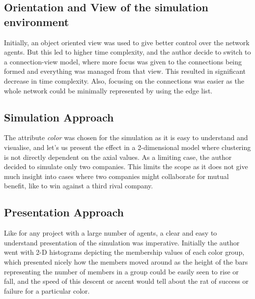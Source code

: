 \subsection{Orientation and View of the simulation environment}

Initially, an object oriented view was used to give better control over the network agents. But this led to higher time complexity, and the author decide to switch to a connection-view model, where more focus was given to the connections being formed and everything was managed from that view. This resulted in significant decrease in time complexity.
Also, focusing on the connections was easier as the whole network could be minimally represented by using the edge list.



\subsection{Simulation Approach}

The attribute \emph{color} was chosen for the simulation as it is easy to understand and visualise, and let's us present the effect in a 2-dimensional model where clustering is not directly dependent on the axial values. 
As a limiting case, the author decided to simulate only two companies. This limits the scope as it does not give much insight into cases where two companies might collaborate for mutual benefit, like to win against a third rival company.


\subsection{Presentation Approach}
Like for any project with a large number of agents, a clear and easy to understand presentation of the simulation was imperative.
Initially the author went with 2-D histograms depicting the membership values of each color group, which presented nicely how the members moved around as the height of the  bars representing the number of members in a group could be easily seen to rise or fall, and the speed of this descent or ascent would tell about the rat of success or failure for a particular color.

